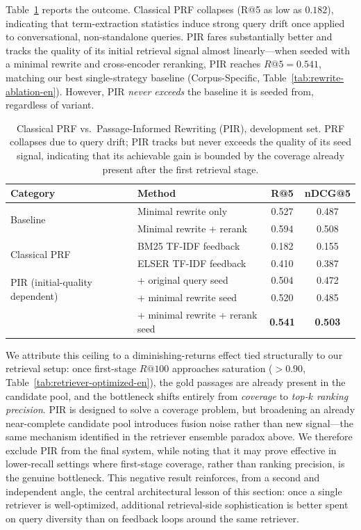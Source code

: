 Table~\ref{tab:pir-en} reports the outcome. Classical PRF collapses (R@5 as low as $0.182$), indicating that term-extraction statistics induce strong query drift once applied to conversational, non-standalone queries. PIR fares substantially better and tracks the quality of its initial retrieval signal almost linearly---when seeded with a minimal rewrite and cross-encoder reranking, PIR reaches $R@5{=}0.541$, matching our best single-strategy baseline (Corpus-Specific, Table~\ref{tab:rewrite-ablation-en}). However, PIR \emph{never exceeds} the baseline it is seeded from, regardless of variant.

\begin{table}[h]
\centering
\small
\begin{tabular}{llcc}
\toprule
\textbf{Category} & \textbf{Method} & \textbf{R@5} & \textbf{nDCG@5} \\
\midrule
\multirow{2}{*}{Baseline} & Minimal rewrite only & 0.527 & 0.487 \\
 & Minimal rewrite + rerank & 0.594 & 0.508 \\
\midrule
\multirow{2}{*}{Classical PRF} & BM25 TF-IDF feedback & 0.182 & 0.155 \\
 & ELSER TF-IDF feedback & 0.410 & 0.387 \\
\midrule
\multirow{2}{*}{PIR (initial-quality dependent)} & + original query seed & 0.504 & 0.472 \\
 & + minimal rewrite seed & 0.520 & 0.485 \\
 & + minimal rewrite + rerank seed & \textbf{0.541} & \textbf{0.503} \\
\bottomrule
\end{tabular}
\caption{Classical PRF vs.\ Passage-Informed Rewriting (PIR), development set. PRF collapses due to query drift; PIR tracks but never exceeds the quality of its seed signal, indicating that its achievable gain is bounded by the coverage already present after the first retrieval stage.}
\label{tab:pir-en}
\end{table}

We attribute this ceiling to a diminishing-returns effect tied structurally to our retrieval setup: once first-stage $R@100$ approaches saturation ($>0.90$, Table~\ref{tab:retriever-optimized-en}), the gold passages are already present in the candidate pool, and the bottleneck shifts entirely from \emph{coverage} to \emph{top-$k$ ranking precision}. PIR is designed to solve a coverage problem, but broadening an already near-complete candidate pool introduces fusion noise rather than new signal---the same mechanism identified in the retriever ensemble paradox above. We therefore exclude PIR from the final system, while noting that it may prove effective in lower-recall settings where first-stage coverage, rather than ranking precision, is the genuine bottleneck. This negative result reinforces, from a second and independent angle, the central architectural lesson of this section: once a single retriever is well-optimized, additional retrieval-side sophistication is better spent on query diversity than on feedback loops around the same retriever.

